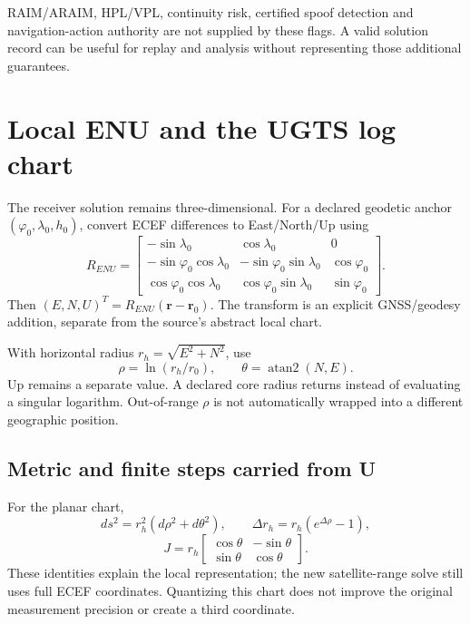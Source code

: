 RAIM/ARAIM, HPL/VPL, continuity risk, certified spoof detection and navigation-action
authority are not supplied by these flags. A valid solution record can be useful for
replay and analysis without representing those additional guarantees.
\clearpage
\section{Local ENU and the UGTS log chart}
The receiver solution remains three-dimensional. For a declared geodetic anchor
$(\varphi_0,\lambda_0,h_0)$, convert ECEF differences to East/North/Up using
\begin{equation}
R_{ENU}=\begin{bmatrix}
-\sin\lambda_0&\cos\lambda_0&0\\
-\sin\varphi_0\cos\lambda_0&-\sin\varphi_0\sin\lambda_0&\cos\varphi_0\\
\cos\varphi_0\cos\lambda_0&\cos\varphi_0\sin\lambda_0&\sin\varphi_0
\end{bmatrix}.
\end{equation}
Then $(E,N,U)^T=R_{ENU}(\boldsymbol r-\boldsymbol r_0)$. The transform is an explicit
GNSS/geodesy addition, separate from the source's abstract local chart. 

With horizontal radius $r_h=\sqrt{E^2+N^2}$, use
\begin{equation}
\rho=\ln(r_h/r_0),\qquad\theta=\operatorname{atan2}(N,E).
\end{equation}
Up remains a separate value. A declared core radius returns 
instead of evaluating a singular logarithm. Out-of-range $\rho$ is not automatically
wrapped into a different geographic position. 

\subsection{Metric and finite steps carried from U}
For the planar chart,
\begin{equation}
ds^2=r_h^2(d\rho^2+d\theta^2),\qquad
\Delta r_h=r_h(e^{\Delta\rho}-1),
\end{equation}
\begin{equation}
J=r_h\begin{bmatrix}\cos\theta&-\sin\theta\\\sin\theta&\cos\theta\end{bmatrix}.
\end{equation}
These identities explain the local representation; the new satellite-range solve
still uses full ECEF coordinates. Quantizing this chart does not improve the original
measurement precision or create a third coordinate. 

